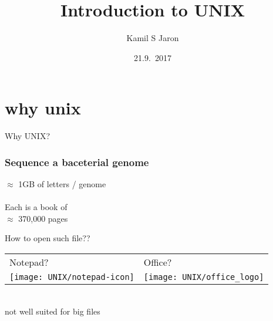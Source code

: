 \documentclass[xcolor=dvipsnames]{beamer}
\title[ ]{Introduction to UNIX}
\author{Kamil S Jaron}
\date{21.9.~2017}
\begin{document}
\Large
\begin{frame}
	\titlepage
\end{frame}


\section{why unix}

\begin{frame}
	\Huge
	\begin{center}
		Why UNIX?
	\end{center}
\end{frame}

\begin{frame}
	\frametitle{Sequence a baceterial genome}
	\Huge
	$\approx$ 1GB of letters / genome \\
	~\\
	Each is a book of \\ \hfill $\approx$ 370,000 pages
\end{frame}

\begin{frame}
	\begin{center}
	\huge
	How to open such file?? \\
	\vspace{1cm}

	\Large
	\begin{tabular}{C{0.4\textwidth}C{0.4\textwidth}}
	Notepad? & Office? \\
	\texttt{[image: UNIX/notepad-icon]} & \texttt{[image: UNIX/office\_logo]} \\
	\end{tabular} \\
	\small not well suited for big files
	\end{center}
\end{frame}
\end{document}
